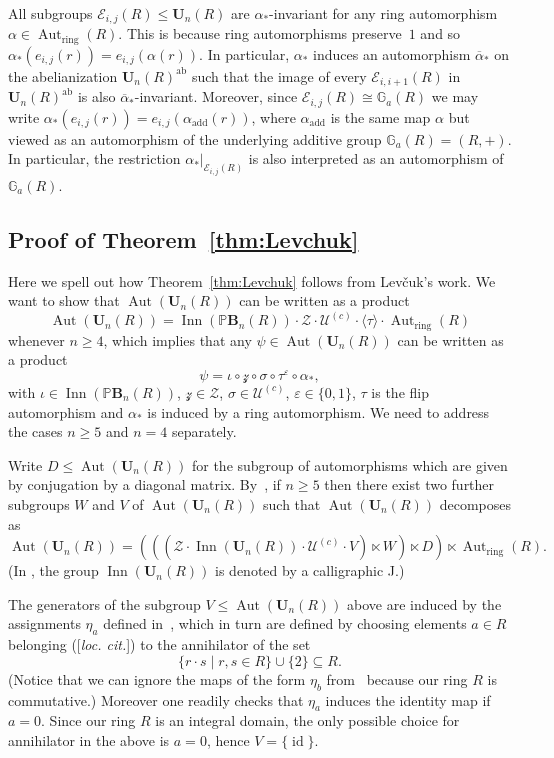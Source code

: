 \documentclass[a4paper,11pt]{amsart}
\numberwithin{equation}{section}
\theoremstyle{plain}
\theoremstyle{definition}
\newenvironment{rmk}
  {\pushQED{\qed}\renewcommand{\qedsymbol}{$\triangle$}\rmkx}
  {\popQED\endrmkx}
\newcommand{\anel}[1]{#1_{\text{ring}}} %
\newcommand{\addi}[1]{#1_{\text{add}}} %
\newcommand{\eij}{e_{i,j}} %
\newcommand{\sbgpeij}{\mathcal{E}_{i,j}} %
\newcommand{\mbU}{\mathbf{U}} %
\newcommand{\Addi}{\mathbb{G}_{a}} %
\newcommand{\PB}{\mathbb{P}\mathbf{B}} %
\newcommand{\veps}{\varepsilon} %
\newcommand{\barra}[1]{\overline{#1}}
\newcommand{\gera}[1]{\langle {#1} \rangle}
\newcommand{\set}[1]{\{ #1 \}}
\newcommand{\mc}{\mathcal}
\DeclareMathOperator{\Aut}{Aut}
\DeclareMathOperator{\Inn}{Inn}
\DeclareMathOperator{\id}{id}
\begin{document}
\begin{rmk} \label{obs:ringautomorphisms}
All subgroups $\sbgpeij(R) \leq \mbU_n(R)$ are $\alpha_\ast$-invariant for any ring automorphism $\alpha \in \anel{\Aut}(R)$. This is because ring automorphisms preserve~$1$ and so $\alpha_\ast(\eij(r)) = \eij(\alpha(r))$. In particular, $\alpha_\ast$ induces an automorphism $\barra{\alpha}_\ast$ on the abelianization $\mbU_n(R)^{\mathrm{ab}}$ such that the image of every $\mc{E}_{i,i+1}(R)$ in $\mbU_n(R)^{\mathrm{ab}}$ is also $\barra{\alpha}_\ast$-invariant. Moreover, since $\sbgpeij(R) \cong \Addi(R)$ we may write $\alpha_\ast(\eij(r)) = \eij(\addi{\alpha}(r))$, where $\addi{\alpha}$ is the same map $\alpha$ but viewed as an automorphism of the underlying additive group $\Addi(R) = (R,+)$. In particular, the restriction $\alpha_\ast|_{\sbgpeij(R)}$ is also interpreted as an automorphism of $\Addi(R)$.
\end{rmk}

\subsection{Proof of Theorem~\ref{thm:Levchuk}}\label{Levchuk:proof}

Here we spell out how Theorem~\ref{thm:Levchuk} follows from Lev\v{c}uk's work. We want to show that $\Aut(\mbU_n(R))$ can be written as a product
\[\Aut(\mbU_n(R)) = \Inn(\PB_n(R)) \cdot \mc{Z} \cdot \mc{U}^{(c)} \cdot \gera{\tau} \cdot \anel{\Aut}(R)\]
whenever $n\geq 4$, which implies that any $\psi \in \Aut(\mbU_n(R))$ can be written as a product 
\[\psi = \iota \circ \mc{z} \circ \sigma \circ \tau^\veps \circ \alpha_\ast,\] with $\iota \in \Inn(\PB_n(R))$, $\mc{z} \in \mc{Z}$, $\sigma \in \mc{U}^{(c)}$, $\varepsilon \in \{0,1\}$, $\tau$ is the flip automorphism and $\alpha_\ast$ is induced by a ring automorphism. We need to address the cases $n\geq 5$ and $n=4$ separately.

Write $D \leq \Aut(\mbU_n(R))$ for the subgroup of automorphisms which are given by conjugation by a diagonal matrix. By~\cite[Corollary~3]{LevchukOriginal}, if $n \geq 5$ then there exist two further subgroups $W$ and $V$ of $\Aut(\mbU_n(R))$ such that $\Aut(\mbU_n(R))$ decomposes as 
\[ \Aut(\mbU_n(R)) = (((\mc{Z} \cdot \Inn(\mbU_n(R)) \cdot \mc{U}^{(c)} \cdot V) \ltimes W) \ltimes D) \ltimes \anel{\Aut}(R). \]
(In \cite{LevchukOriginal}, the group $\Inn(\mbU_n(R))$ is denoted by a calligraphic J.)

The generators of the subgroup $V \leq \Aut(\mbU_n(R))$ above are induced by the assignments $\eta_a$ defined in~\cite[66]{LevchukOriginal}, which in turn are defined by choosing elements $a \in R$ belonging ([\emph{loc. cit.}]) to the annihilator of the set 
\[\set{r\cdot s \mid r,s \in R} \cup \set{2} \subseteq R.\] 
(Notice that we can ignore the maps of the form $\eta_b$ from~\cite[66]{LevchukOriginal} because our ring $R$ is commutative.) Moreover one readily checks that $\eta_a$ induces the identity map if $a = 0$. Since our ring $R$ is an integral domain, the only possible choice for annihilator in the above is $a = 0$, hence $V = \set{\id}$.
\end{document}
